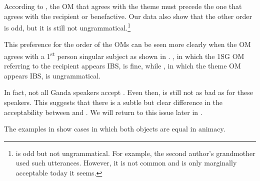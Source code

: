 \documentclass[output=paper,
            colorlinks, citecolor=brown
            ,draftmode
		  ]{langscibook}
\begin{document}
\ea%
    \label{ex:yoneda:28}
    \z
\z

    According to \citet[599]{Ranero2019}, the OM that agrees with the theme must precede the one that agrees with the recipient or benefactive. Our data also show that the other order is odd, but it is still not ungrammatical.\footnote{ is odd but not ungrammatical. For example, the second author's grandmother used such utterances. However, it is not common and is only marginally acceptable today it seems.}

    This preference for the order of the OMs can be seen more clearly when the OM agrees with a 1\textsuperscript{st} person singular subject as shown in . , in which the 1SG OM referring to the recipient appears IBS, is fine, while , in which the theme OM appears IBS, is ungrammatical.


\ea%
    \label{ex:yoneda:29}
    \z
\z


    In fact, not all Ganda speakers accept . Even then,  is still not as bad as  for these speakers. This suggests that there is a subtle but clear difference in the acceptability between  and . We will return to this issue later in .


    The examples in  show cases in which both objects are equal in animacy. 
\end{document}

